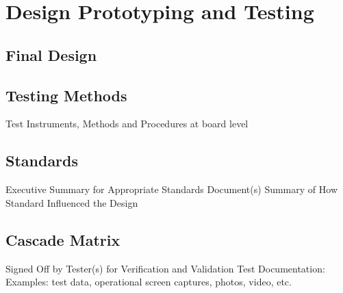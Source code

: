 \chapter{Design Prototyping and Testing}
\section{Final Design}
\section{Testing Methods}
Test Instruments, Methods and Procedures at board level
\section{Standards}
Executive Summary for Appropriate Standards Document(s)
Summary of How Standard Influenced the Design
\section{Cascade Matrix}
Signed Off by Tester(s) for Verification and Validation
Test Documentation: Examples: test data, operational screen captures, photos,
video, etc.
